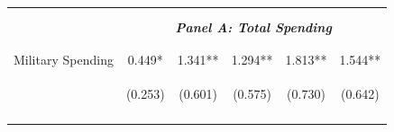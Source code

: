 \documentclass[dv_diss_main.tex]{subfiles}
\begin{document}
\begin{table}[H]
\begin{center}
{\begin{tabular}{lccccc}
    \vspace{-2pt} & \vspace{-2pt} & \vspace{-2pt} & \vspace{-2pt} & \vspace{-2pt} \\\hline
    \vspace{-1.5pt} & \vspace{-1.5pt} & \vspace{-1.5pt} & \vspace{-1.5pt} & \vspace{-1.5pt} \\
    \cmidrule{2-6}
    \vspace{-1.5pt} & \vspace{-1.5pt} & \vspace{-1.5pt} & \vspace{-1.5pt} & \vspace{-1.5pt} \\
    & \multicolumn{5}{c}{\textit{\textbf{Panel A: Total Spending}}} \\ 
    \vspace{-1.5pt} & \vspace{-1.5pt} & \vspace{-1.5pt} & \vspace{-1.5pt} & \vspace{-1.5pt} \\ 
    \cmidrule{2-6}
    \vspace{-1.5pt} & \vspace{-1.5pt} & \vspace{-1.5pt} & \vspace{-1.5pt} & \vspace{-1.5pt}\\
     Military Spending & 0.449* & 1.341** & 1.294** & 1.813** & 1.544** \\
    & \begin{footnotesize}(0.253)\end{footnotesize} & \begin{footnotesize}(0.601)\end{footnotesize} & \begin{footnotesize}(0.575)\end{footnotesize} & \begin{footnotesize}(0.730)\end{footnotesize} & \begin{footnotesize}(0.642)\end{footnotesize} \\
    \vspace{-1.5pt} & \vspace{-1.5pt} & \vspace{-1.5pt} & \vspace{-1.5pt} & \vspace{-1.5pt} \\
    

\end{tabular}}
\end{center}
\end{table}
\end{document}
